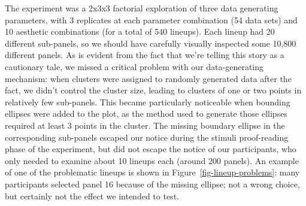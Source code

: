 \documentclass[
  10pt,
]{article}
\begin{document}
The experiment was a 2x3x3 factorial exploration of three data
generating parameters, with 3 replicates at each parameter combination
(54 data sets) and 10 aesthetic combinations (for a total of 540
lineups). Each lineup had 20 different sub-panels, so we should have
carefully visually inspected some 10,800 different panels. As is evident
from the fact that we're telling this story as a cautionary tale, we
missed a critical problem with our data-generating mechanism: when
clusters were assigned to randomly generated data after the fact, we
didn't control the cluster size, leading to clusters of one or two
points in relatively few sub-panels. This became particularly noticeable
when bounding ellipses were added to the plot, as the method used to
generate those ellipses required at least 3 points in the cluster. The
missing boundary ellipse in the corresponding sub-panels escaped our
notice during the stimuli proof-reading phase of the experiment, but did
not escape the notice of our participants, who only needed to examine
about 10 lineups each (around 200 panels). An example of one of the
problematic lineups is shown in Figure~\ref{fig-lineup-problems}: many
participants selected panel 16 because of the missing ellipse; not a
wrong choice, but certainly not the effect we intended to test.
\end{document}
